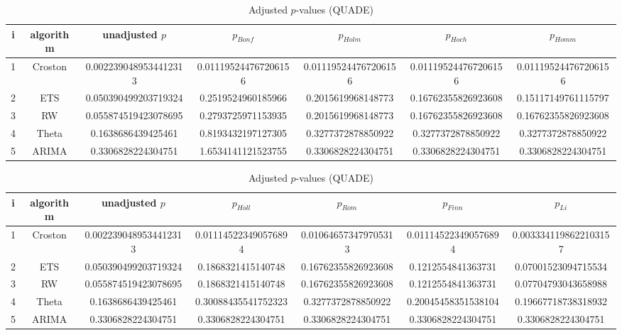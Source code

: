 \documentclass[a4paper,10pt]{article}
\begin{document}
\begin{landscape}
\begin{table}[!htp]
\centering\scriptsize
\caption{Adjusted $p$-values (QUADE)}
\begin{tabular}{ccccccc}
i&algorithm&unadjusted $p$&$p_{Bonf}$&$p_{Holm}$&$p_{Hoch}$&$p_{Homm}$\\
\hline
1&Croston&0.0022390489534412313&0.011195244767206156&0.011195244767206156&0.011195244767206156&0.011195244767206156\\
2&ETS&0.050390499203719324&0.2519524960185966&0.2015619968148773&0.16762355826923608&0.15117149761115797\\
3&RW&0.055874519423078695&0.2793725971153935&0.2015619968148773&0.16762355826923608&0.16762355826923608\\
4&Theta&0.1638686439425461&0.8193432197127305&0.3277372878850922&0.3277372878850922&0.3277372878850922\\
5&ARIMA&0.3306828224304751&1.6534141121523755&0.3306828224304751&0.3306828224304751&0.3306828224304751\\
\hline
\end{tabular}
\end{table}

\begin{table}[!htp]
\centering\scriptsize
\caption{Adjusted $p$-values (QUADE)}
\begin{tabular}{ccccccc}
i&algorithm&unadjusted $p$&$p_{Holl}$&$p_{Rom}$&$p_{Finn}$&$p_{Li}$\\
\hline
1&Croston&0.0022390489534412313&0.011145223490576894&0.010646573479705313&0.011145223490576894&0.0033341198622103157\\
2&ETS&0.050390499203719324&0.1868321415140748&0.16762355826923608&0.1212554841363731&0.07001523094715534\\
3&RW&0.055874519423078695&0.1868321415140748&0.16762355826923608&0.1212554841363731&0.07704793043658988\\
4&Theta&0.1638686439425461&0.30088435541752323&0.3277372878850922&0.20045458351538104&0.19667718738318932\\
5&ARIMA&0.3306828224304751&0.3306828224304751&0.3306828224304751&0.3306828224304751&0.3306828224304751\\
\hline
\end{tabular}
\end{table}

\end{landscape}
\end{document}
